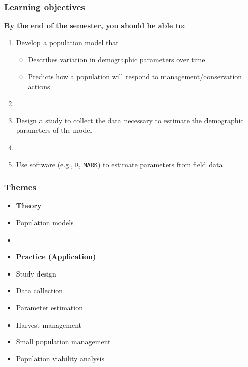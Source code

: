 \documentclass[color=usenames,dvipsnames]{beamer}
\begin{document}
\begin{frame}
  \frametitle{Learning objectives}
  \large
  {\bf By the end of the semester, you should be able to: \\}
  \vspace{0.3cm}
  \begin{enumerate}[\bf 1.]
    \large
    \item<1-> Develop a population model that
      \begin{itemize}
        \normalsize %
        \item Describes variation in demographic parameters over time
        \item Predicts how a population will respond to
          management/conservation actions
      \end{itemize}
    \item[]
    \item<2-> Design a study to collect the data necessary to estimate
      the demographic parameters of the model
    \item[]
    \item<3-> Use software (e.g., {\tt R}, %
      {\tt MARK}) to estimate parameters from field data
  \end{enumerate}
\end{frame}



\begin{frame}
  \frametitle{Themes}
  \large
  \begin{itemize}
    \item[] {\hspace{-0.9cm} \bf Theory}
    \item Population models
    \item[]
    \item[] {\hspace{-0.9cm} \bf Practice (Application)}
    \item Study design
    \item Data collection
    \item Parameter estimation
    \item Harvest management
    \item Small population management
    \item Population viability analysis
  \end{itemize}
\end{frame}
\end{document}
